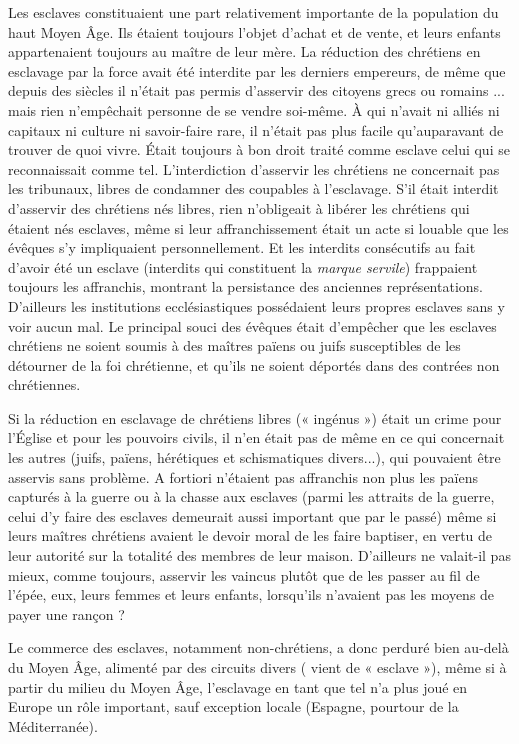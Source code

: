  Les esclaves constituaient une part relativement importante de la population du haut Moyen Âge. Ils étaient toujours l'objet d'achat et de vente, et leurs enfants appartenaient toujours au maître de leur mère. La réduction des chrétiens en esclavage par la force avait été interdite par les derniers empereurs, de même que depuis des siècles il n'était pas permis d'asservir des citoyens grecs ou romains ... mais rien n'empêchait personne de se vendre soi-même. À qui n'avait ni alliés ni capitaux ni culture ni savoir-faire rare, il n'était pas plus facile qu'auparavant de trouver de quoi vivre. Était toujours à bon droit traité comme esclave celui qui se reconnaissait comme tel. L'interdiction d'asservir les chrétiens ne concernait pas les tribunaux, libres de condamner des coupables à l'esclavage. S'il était interdit d'asservir des chrétiens nés libres, rien n'obligeait à libérer les chrétiens qui étaient nés esclaves, même si leur affranchissement était un acte si louable que les évêques s'y impliquaient personnellement. Et les interdits consécutifs au fait d'avoir été un esclave (interdits qui constituent la \emph{marque servile}) frappaient toujours les affranchis, montrant la persistance des anciennes représentations. D'ailleurs les institutions ecclésiastiques possédaient leurs propres esclaves sans y voir aucun mal. Le principal souci des évêques était d'empêcher que les esclaves chrétiens ne soient soumis à des maîtres païens ou juifs susceptibles de les détourner de la foi chrétienne, et qu'ils ne soient déportés dans des contrées non chrétiennes. 

 Si la réduction en esclavage de chrétiens libres (« ingénus ») était un crime pour l'Église et pour les pouvoirs civils, il n'en était pas de même en ce qui concernait les autres (juifs, païens, hérétiques et schismatiques divers...), qui pouvaient être asservis sans problème. A fortiori n'étaient pas affranchis non plus les païens capturés à la guerre ou à la chasse aux esclaves (parmi les attraits de la guerre, celui d'y faire des esclaves demeurait aussi important que par le passé) même si leurs maîtres chrétiens avaient le devoir moral de les faire baptiser, en vertu de leur autorité sur la totalité des membres de leur maison. D'ailleurs ne valait-il pas mieux, comme toujours, asservir les vaincus plutôt que de les passer au fil de l'épée, eux, leurs femmes et leurs enfants, lorsqu'ils n'avaient pas les moyens de payer une rançon ?

 Le commerce des esclaves, notamment non-chrétiens, a donc perduré bien au-delà du Moyen Âge, alimenté par des circuits divers ( vient de « esclave »), même si à partir du milieu du Moyen Âge, l'esclavage en tant que tel n'a plus joué en Europe un rôle important, sauf exception locale (Espagne, pourtour de la Méditerranée). 

